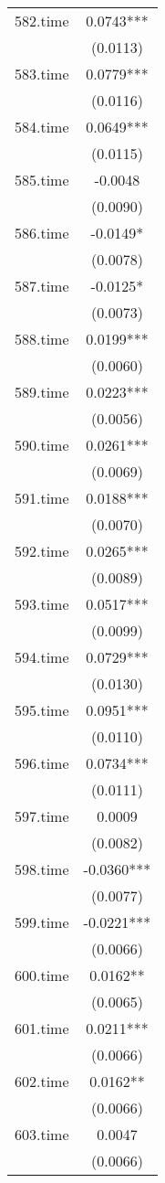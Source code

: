 \documentclass[]{article}
\begin{document}
\begin{tabular}{lc}
582.time & 0.0743*** \\
 & (0.0113) \\
583.time & 0.0779*** \\
 & (0.0116) \\
584.time & 0.0649*** \\
 & (0.0115) \\
585.time & -0.0048 \\
 & (0.0090) \\
586.time & -0.0149* \\
 & (0.0078) \\
587.time & -0.0125* \\
 & (0.0073) \\
588.time & 0.0199*** \\
 & (0.0060) \\
589.time & 0.0223*** \\
 & (0.0056) \\
590.time & 0.0261*** \\
 & (0.0069) \\
591.time & 0.0188*** \\
 & (0.0070) \\
592.time & 0.0265*** \\
 & (0.0089) \\
593.time & 0.0517*** \\
 & (0.0099) \\
594.time & 0.0729*** \\
 & (0.0130) \\
595.time & 0.0951*** \\
 & (0.0110) \\
596.time & 0.0734*** \\
 & (0.0111) \\
597.time & 0.0009 \\
 & (0.0082) \\
598.time & -0.0360*** \\
 & (0.0077) \\
599.time & -0.0221*** \\
 & (0.0066) \\
600.time & 0.0162** \\
 & (0.0065) \\
601.time & 0.0211*** \\
 & (0.0066) \\
602.time & 0.0162** \\
 & (0.0066) \\
603.time & 0.0047 \\
 & (0.0066) \\

\end{tabular}
\end{document}
